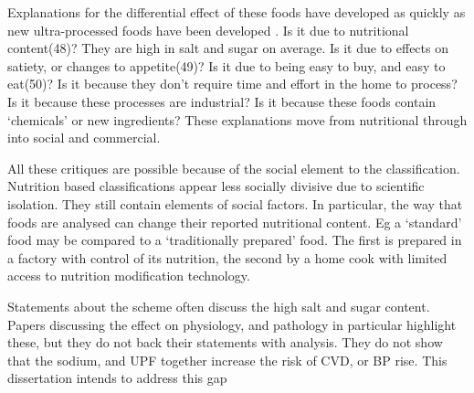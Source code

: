 \documentclass[
]{article}
\begin{document}
Explanations for the differential effect of these foods have developed
as quickly as new ultra-processed foods have been developed . Is it due
to nutritional content(48)? They are high in salt and sugar on average.
Is it due to effects on satiety, or changes to appetite(49)? Is it due
to being easy to buy, and easy to eat(50)? Is it because they don't
require time and effort in the home to process? Is it because these
processes are industrial? Is it because these foods contain `chemicals'
or new ingredients? These explanations move from nutritional through
into social and commercial.

All these critiques are possible because of the social element to the
classification. Nutrition based classifications appear less socially
divisive due to scientific isolation. They still contain elements of
social factors. In particular, the way that foods are analysed can
change their reported nutritional content. Eg a `standard' food may be
compared to a `traditionally prepared' food. The first is prepared in a
factory with control of its nutrition, the second by a home cook with
limited access to nutrition modification technology.

Statements about the scheme often discuss the high salt and sugar
content. Papers discussing the effect on physiology, and pathology in
particular highlight these, but they do not back their statements with
analysis. They do not show that the sodium, and UPF together increase
the risk of CVD, or BP rise. This dissertation intends to address this
gap
\end{document}
